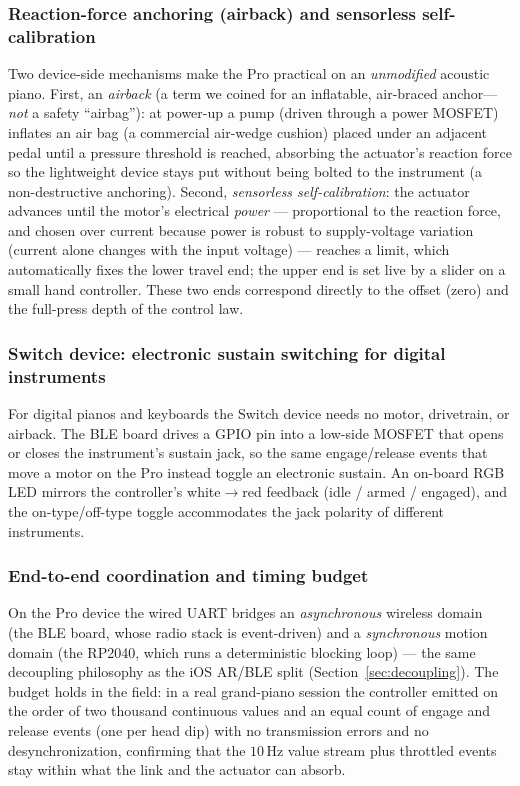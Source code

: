 \subsubsection{Reaction-force anchoring (airback) and sensorless self-calibration}
\label{sec:airback}
Two device-side mechanisms make the Pro practical on an \emph{unmodified}
acoustic piano. First, an \emph{airback} (a term we coined for an inflatable,
air-braced anchor---\emph{not} a safety ``airbag''): at power-up a pump (driven through a
power MOSFET) inflates an air bag (a commercial air-wedge cushion) placed under an
adjacent pedal until a pressure threshold is reached, absorbing the actuator's reaction force so the lightweight
device stays put without being bolted to the instrument (a non-destructive
anchoring). Second, \emph{sensorless self-calibration}: the actuator advances
until the motor's electrical \emph{power} --- proportional to the reaction force,
and chosen over current because power is robust to supply-voltage variation
(current alone changes with the input voltage) --- reaches a limit, which
automatically fixes the lower travel end; the upper end is set live by a slider on
a small hand controller. These two ends correspond directly to the offset (zero)
and the full-press depth of the control law.

\subsubsection{Switch device: electronic sustain switching for digital instruments}
\label{sec:switch}
For digital pianos and keyboards the Switch device needs no motor, drivetrain, or
airback. The BLE board drives a GPIO pin into a low-side MOSFET that opens or
closes the instrument's sustain jack, so the same engage/release events that move
a motor on the Pro instead toggle an electronic sustain. An on-board RGB LED
mirrors the controller's white$\rightarrow$red feedback (idle / armed / engaged),
and the on-type/off-type toggle accommodates the jack polarity of different
instruments.

\subsubsection{End-to-end coordination and timing budget}
\label{sec:coordination}
On the Pro device the wired UART bridges an \emph{asynchronous} wireless domain
(the BLE board, whose radio stack is event-driven) and a \emph{synchronous}
motion domain (the RP2040, which runs a deterministic blocking loop) --- the same
decoupling philosophy as the iOS AR/BLE split (Section~\ref{sec:decoupling}). The
budget holds in the field: in a real grand-piano session the controller emitted
on the order of two thousand continuous values and an equal count of engage and
release events (one per head dip) with no transmission errors and no
desynchronization, confirming that the $10$\,Hz value stream plus throttled
events stay within what the link and the actuator can absorb.
